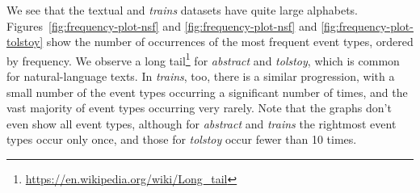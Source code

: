 We see that the textual and \emph{trains} datasets have quite large alphabets. Figures~\ref{fig:frequency-plot-nsf} and \ref{fig:frequency-plot-nsf} and \ref{fig:frequency-plot-tolstoy} show the number of occurrences of the most frequent event types, ordered by frequency. We observe a long tail\footnote{\url{https://en.wikipedia.org/wiki/Long_tail}} for \emph{abstract} and \emph{tolstoy}, which is common for natural-language texts. In \emph{trains}, too, there is a similar progression, with a small number of the event types occurring a significant number of times, and the vast majority of event types occurring very rarely. Note that the graphs don't even show all event types, although for \emph{abstract} and \emph{trains} the rightmost event types occur only once, and those for \emph{tolstoy} occur fewer than 10 times.

